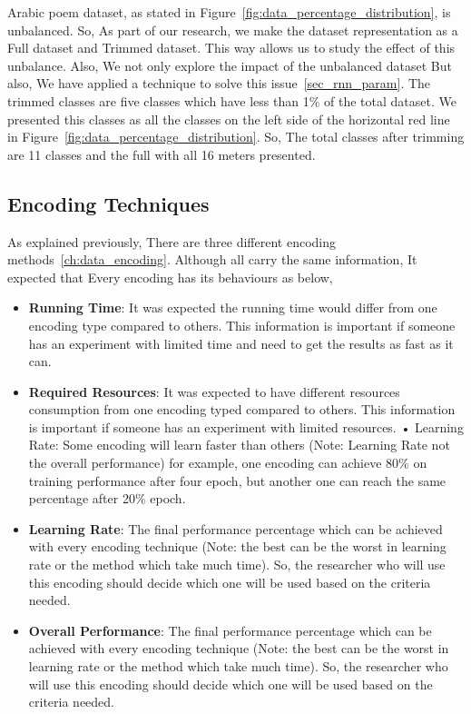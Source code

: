 Arabic poem dataset, as stated in Figure~\ref{fig:data_percentage_distribution}, is unbalanced. So, As part of our research, we make the dataset representation as a Full dataset and Trimmed dataset. This way allows us to study the effect of this unbalance. Also, We not only explore the impact of the unbalanced dataset But also, We have applied a technique to solve this issue~\ref{sec_rnn_param}. The trimmed classes are five classes which have less than 1\% of the total dataset. We presented this classes as all the classes on the left side of the horizontal red line in Figure~\ref{fig:data_percentage_distribution}. So, The total classes after trimming are 11 classes and the full with all 16 meters presented.

\subsection{Encoding Techniques}

As explained previously, There are three different encoding methods~\ref{ch:data_encoding}. Although all carry the same information, It expected that Every encoding has its behaviours as below,
\begin{itemize}
\item \textbf{Running Time}: It was expected the running time would differ from one encoding type compared to others. This information is important if someone has an experiment with limited time and need to get the results as fast as it can.
\item \textbf{Required Resources}: It was expected to have different resources consumption from one encoding typed compared to others. This information is important if someone has an experiment with limited resources.
• Learning Rate: Some encoding will learn faster than others (Note: Learning Rate not the overall performance) for example, one encoding can achieve 80\% on training performance after four epoch, but another one can reach the same percentage after 20\% epoch.
\item \textbf{Learning Rate}: The final performance percentage which can be achieved with every encoding technique (Note: the best can be the worst in learning rate or the method which take much time). So, the researcher who will use this encoding should decide which one will be used based on the criteria needed.

\item \textbf{Overall Performance}: The final performance percentage which can be achieved with every encoding technique (Note: the best can be the worst in learning rate or the method which take much time). So, the researcher who will use this encoding should decide which one will be used based on the criteria needed.

  \end{itemize}


